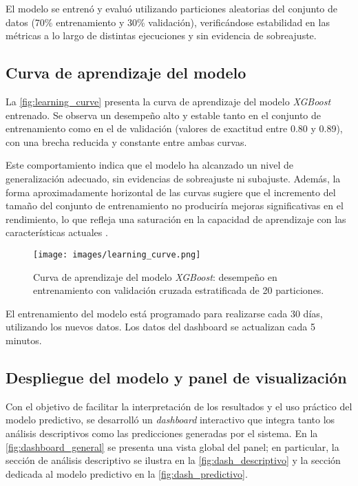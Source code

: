 \documentclass[12pt]{article}
\begin{document}
El modelo se entrenó y evaluó utilizando particiones aleatorias del conjunto de datos (70\% entrenamiento y 30\% validación), verificándose estabilidad en las métricas a lo largo de distintas ejecuciones y sin evidencia de sobreajuste.

\subsection{Curva de aprendizaje del modelo}

La \autoref{fig:learning_curve} presenta la curva de aprendizaje del modelo \textit{XGBoost} entrenado. Se observa un desempeño alto y estable tanto en el conjunto de entrenamiento como en el de validación (valores de exactitud entre 0.80 y 0.89), con una brecha reducida y constante entre ambas curvas.

Este comportamiento indica que el modelo ha alcanzado un nivel de generalización adecuado, sin evidencias de sobreajuste ni subajuste. Además, la forma aproximadamente horizontal de las curvas sugiere que el incremento del tamaño del conjunto de entrenamiento no produciría mejoras significativas en el rendimiento, lo que refleja una saturación en la capacidad de aprendizaje con las características actuales \parencite{raschka2018, chen2015}.

\begin{figure}[H]
    \centering
    \texttt{[image: images/learning\_curve.png]}
    \caption{Curva de aprendizaje del modelo \textit{XGBoost}: desempeño en entrenamiento con validación cruzada estratificada de 20 particiones.}
    \label{fig:learning_curve}
\end{figure}

El entrenamiento del modelo está programado para realizarse cada 30 días, utilizando los nuevos datos. Los datos del dashboard se actualizan cada 5 minutos.

\subsection{Despliegue del modelo y panel de visualización}

Con el objetivo de facilitar la interpretación de los resultados y el uso práctico del modelo predictivo, se desarrolló un \textit{dashboard} interactivo que integra tanto los análisis descriptivos como las predicciones generadas por el sistema. En la \autoref{fig:dashboard_general} se presenta una vista global del panel; en particular, la sección de análisis descriptivo se ilustra en la \autoref{fig:dash_descriptivo} y la sección dedicada al modelo predictivo en la \autoref{fig:dash_predictivo}.
\end{document}
